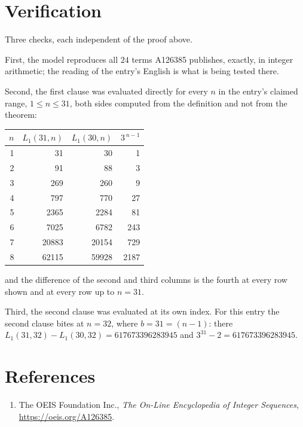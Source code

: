 \documentclass[11pt,a4paper]{article}
\theoremstyle{plain}
\theoremstyle{definition}
\begin{document}
\section{Verification}

Three checks, each independent of the proof above.

First, the model reproduces all $24$ terms A126385 publishes, exactly, in integer
arithmetic; the reading of the entry's English is what is being tested there.

Second, the first clause was evaluated directly for every $n$ in the entry's claimed range,
$1\le n\le31$, both sides computed from the definition and not from the theorem:

\begin{center}
\begin{tabular}{rrrr}
$n$ & $L_{1}(31,n)$ & $L_{1}(30,n)$ & $3^{\,n-1}$ \\ \hline
1 & 31 & 30 & 1 \\
2 & 91 & 88 & 3 \\
3 & 269 & 260 & 9 \\
4 & 797 & 770 & 27 \\
5 & 2365 & 2284 & 81 \\
6 & 7025 & 6782 & 243 \\
7 & 20883 & 20154 & 729 \\
8 & 62115 & 59928 & 2187 \\
\end{tabular}
\end{center}

\noindent and the difference of the second and third columns is the fourth at every row shown
and at every row up to $n=31$.

Third, the second clause was evaluated at its own index. For this entry the second clause bites at $n=32$, where $b=31=(n-1)$: there $L_{1}(31,32)-L_{1}(30,32)=617673396283945$ and $3^{31}-2=617673396283945$.

\section*{References}
\begin{enumerate}
\item The OEIS Foundation Inc., \emph{The On-Line Encyclopedia of Integer Sequences},
\url{https://oeis.org/A126385}.
\end{enumerate}
\end{document}
